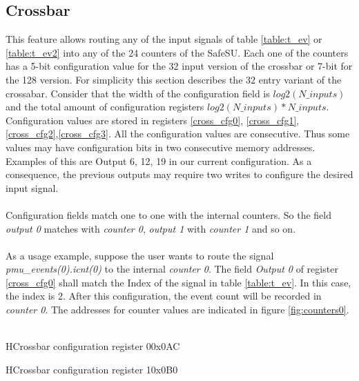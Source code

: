 \subsection{Crossbar}
This feature allows routing any of the input signals of table \ref{table:t_ev} or \ref{table:t_ev2} into any of the 24 counters of the SafeSU. Each one of the counters has a 5-bit configuration value for the 32 input version of the crossbar or 7-bit for the 128 version. For simplicity this section describes the 32 entry variant of the crossabar. Consider that the width of the configuration field is $log2(N\_inputs)$ and the total amount of configuration registers $log2(N\_inputs)*N\_inputs$.\\
Configuration values are stored in registers \ref{cross_cfg0}, \ref{cross_cfg1}, \ref{cross_cfg2},\ref{cross_cfg3}. All the configuration values are consecutive. Thus some values may have configuration bits in two consecutive memory addresses. Examples of this are Output 6, 12, 19 in our current configuration. As a consequence, the previous outputs may require two writes to configure the desired input signal.\\
\\
Configuration fields match one to one with the internal counters. So the field \textit{output 0} matches with \textit{counter 0}, \textit{output 1} with\textit{ counter 1} and so on.\\
\\
As a usage example, suppose the user wants to route the signal \textit{pmu\_events(0).icnt(0)} to the internal \textit{counter 0}. The field \textit{Output 0} of register \ref{cross_cfg0} shall match the  Index of the signal in table \ref{table:t_ev}. In this case, the index is 2. After this configuration, the event count will be recorded in \textit{counter 0}. The addresses for counter values are indicated in figure \ref{fig:counters0}.\\
\\
 \begin{register}{H}{Crossbar configuration register 0}{0x0AC}
	\label{cross_cfg0}
	\regnewline
	
\end{register}

 \begin{register}{H}{Crossbar configuration register 1}{0x0B0}
	\label{cross_cfg1}
	\regnewline
\end{register}

